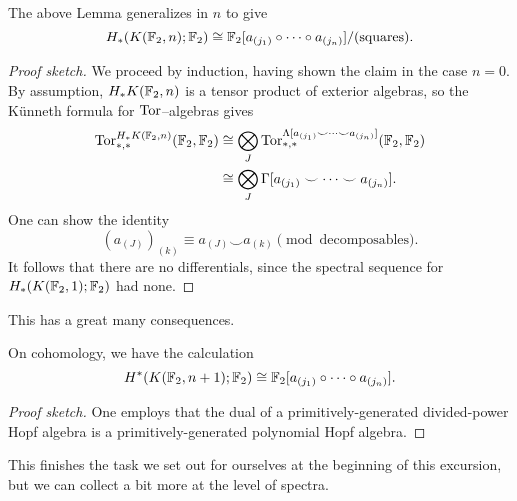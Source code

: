 \begin{theorem}
The above Lemma generalizes in $n$ to give \[H_* (K(\mathbb F_2, n); \mathbb F_2) \cong \mathbb F_2[a_{(j_1)} \circ \cdots \circ a_{(j_n)}] / (\text{squares}).\]
\end{theorem}
\begin{proof}[Proof sketch]
We proceed by induction, having shown the claim in the case $n = 0$.
By assumption, $H_* K(\mathbb F_2, n)$ is a tensor product of exterior algebras, so the K\"unneth formula for $\operatorname{Tor}$--algebras gives
\begin{align*}
\operatorname{Tor}^{H_* K(\mathbb F_2, n)}_{*, *}(\mathbb F_2, \mathbb F_2) & \cong \bigotimes_J \operatorname{Tor}^{\Lambda[a_{(j_1)} \smile \cdots \smile a_{(j_n)}]}_{*, *}(\mathbb F_2, \mathbb F_2) \\
& \cong \bigotimes_J \Gamma[a_{(j_1)} \smile \cdots \smile a_{(j_n)}].
\end{align*}
One can show the identity  \[(a_{(J)})_{(k)} \equiv a_{(J)} \smile a_{(k)} \pmod{\text{decomposables}}.\]
It follows that there are no differentials, since the spectral sequence for $H_*(K(\mathbb F_2, 1); \mathbb F_2)$ had none.
\end{proof}

This has a great many consequences.

\begin{corollary}
On cohomology, we have the calculation \[H^*(K(\mathbb F_2, n+1); \mathbb F_2) \cong \mathbb F_2[a_{(j_1)} \circ \cdots \circ a_{(j_n)}].\]
\end{corollary}
\begin{proof}[Proof sketch]
One employs that the dual of a primitively-generated divided-power Hopf algebra is a primitively-generated polynomial Hopf algebra.
\end{proof}

\noindent
This finishes the task we set out for ourselves at the beginning of this excursion, but we can collect a bit more at the level of spectra.

